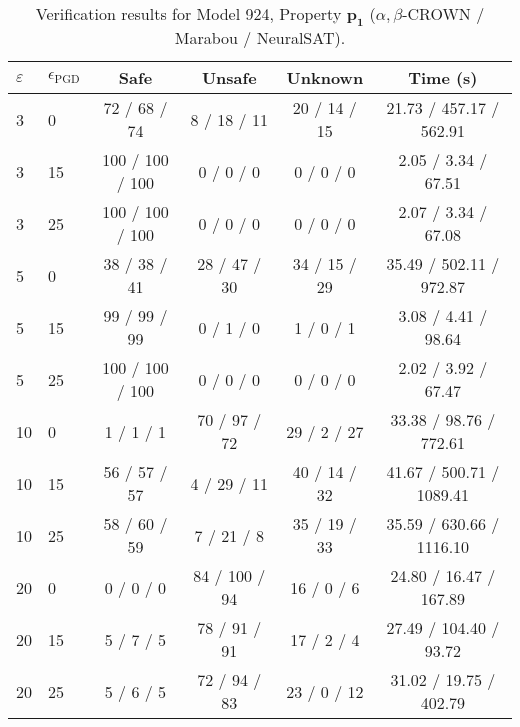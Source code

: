\begin{table}[htbp]\centering
\caption{\small Verification results for Model 924, Property $\mathbf{p_{1}}$ ($\alpha,\beta$-CROWN / Marabou / NeuralSAT).}
\label{tab:model924_p1}
\begin{tabular}{llcccc}
\toprule
$\varepsilon$ & $\epsilon_{\scriptscriptstyle\mathrm{PGD}}$ & Safe & Unsafe & Unknown & Time (s) \\
\midrule
3 & 0 & 72 / 68 / 74 & 8 / 18 / 11 & 20 / 14 / 15 & 21.73 / 457.17 / 562.91 \\
3 & 15 & 100 / 100 / 100 & 0 / 0 / 0 & 0 / 0 / 0 & 2.05 / 3.34 / 67.51 \\
3 & 25 & 100 / 100 / 100 & 0 / 0 / 0 & 0 / 0 / 0 & 2.07 / 3.34 / 67.08 \\
5 & 0 & 38 / 38 / 41 & 28 / 47 / 30 & 34 / 15 / 29 & 35.49 / 502.11 / 972.87 \\
5 & 15 & 99 / 99 / 99 & 0 / 1 / 0 & 1 / 0 / 1 & 3.08 / 4.41 / 98.64 \\
5 & 25 & 100 / 100 / 100 & 0 / 0 / 0 & 0 / 0 / 0 & 2.02 / 3.92 / 67.47 \\
10 & 0 & 1 / 1 / 1 & 70 / 97 / 72 & 29 / 2 / 27 & 33.38 / 98.76 / 772.61 \\
10 & 15 & 56 / 57 / 57 & 4 / 29 / 11 & 40 / 14 / 32 & 41.67 / 500.71 / 1089.41 \\
10 & 25 & 58 / 60 / 59 & 7 / 21 / 8 & 35 / 19 / 33 & 35.59 / 630.66 / 1116.10 \\
20 & 0 & 0 / 0 / 0 & 84 / 100 / 94 & 16 / 0 / 6 & 24.80 / 16.47 / 167.89 \\
20 & 15 & 5 / 7 / 5 & 78 / 91 / 91 & 17 / 2 / 4 & 27.49 / 104.40 / 93.72 \\
20 & 25 & 5 / 6 / 5 & 72 / 94 / 83 & 23 / 0 / 12 & 31.02 / 19.75 / 402.79 \\
\bottomrule
\end{tabular}
\end{table}

